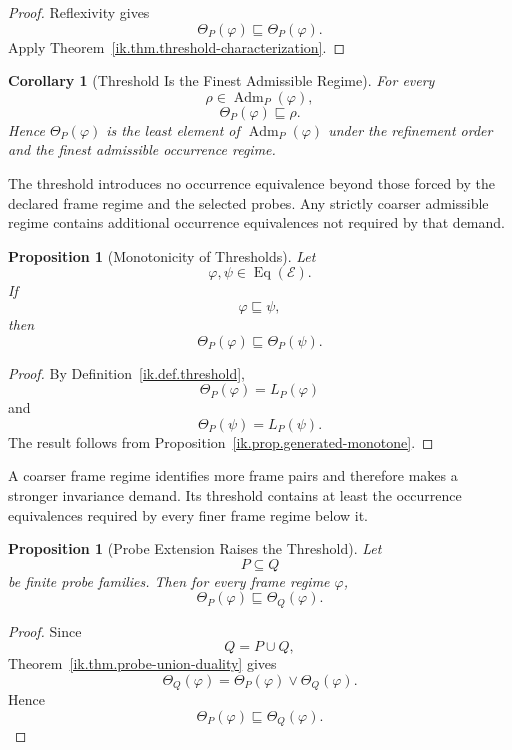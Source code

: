 \documentclass[11pt]{article}
\theoremstyle{plain}
\newtheorem{proposition}[theorem]{Proposition}
\newtheorem{corollary}[theorem]{Corollary}
\theoremstyle{definition}
\theoremstyle{remark}
\begin{document}
\begin{proof}
  Reflexivity gives
  \[
    \Theta_P(\varphi)
    \sqsubseteq
    \Theta_P(\varphi).
  \]
  Apply Theorem~\ref{ik.thm.threshold-characterization}.
\end{proof}

\begin{corollary}[Threshold Is the Finest Admissible Regime]
  \label{ik.cor.threshold-finest}
  For every
  \[
    \rho
    \in
    \operatorname{Adm}_P(\varphi),
  \]
  \[
    \Theta_P(\varphi)
    \sqsubseteq
    \rho.
  \]
  Hence \(\Theta_P(\varphi)\)
  is the least element of
  \(\operatorname{Adm}_P(\varphi)\)
  under the refinement order
  and the finest admissible occurrence regime.
\end{corollary}

The threshold introduces no occurrence equivalence
beyond those forced by the declared frame regime
and the selected probes.
Any strictly coarser admissible regime
contains additional occurrence equivalences
not required by that demand.

\begin{proposition}[Monotonicity of Thresholds]
  \label{ik.prop.threshold-monotone}
  Let
  \[
    \varphi,\psi
    \in
    \operatorname{Eq}(\mathcal{E}).
  \]
  If
  \[
    \varphi
    \sqsubseteq
    \psi,
  \]
  then
  \[
    \Theta_P(\varphi)
    \sqsubseteq
    \Theta_P(\psi).
  \]
\end{proposition}

\begin{proof}
  By Definition~\ref{ik.def.threshold},
  \[
    \Theta_P(\varphi)
    =
    L_P(\varphi)
  \]
  and
  \[
    \Theta_P(\psi)
    =
    L_P(\psi).
  \]
  The result follows from
  Proposition~\ref{ik.prop.generated-monotone}.
\end{proof}

A coarser frame regime identifies more frame pairs
and therefore makes a stronger invariance demand.
Its threshold contains at least
the occurrence equivalences required
by every finer frame regime below it.

\begin{proposition}[Probe Extension Raises the Threshold]
  \label{ik.prop.threshold-probes}
  Let
  \[
    P
    \subseteq
    Q
  \]
  be finite probe families.
  Then for every frame regime \(\varphi\),
  \[
    \Theta_P(\varphi)
    \sqsubseteq
    \Theta_Q(\varphi).
  \]
\end{proposition}

\begin{proof}
  Since
  \[
    Q
    =
    P\cup Q,
  \]
  Theorem~\ref{ik.thm.probe-union-duality}
  gives
  \[
    \Theta_Q(\varphi)
    =
    \Theta_P(\varphi)
    \vee
    \Theta_Q(\varphi).
  \]
  Hence
  \[
    \Theta_P(\varphi)
    \sqsubseteq
    \Theta_Q(\varphi).
  \]
\end{proof}
\end{document}
